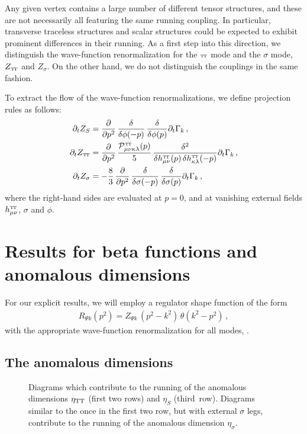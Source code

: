 \documentclass[11pt]{book} %
\newcommand\TTspace{ -1pt }
\newcommand\TT{ \scriptscriptstyle{\mathrm{T\hspace{\TTspace}T}} }
\newcommand\hTTmunu{ h^{\scriptscriptstyle{\mathrm{T\hspace{\TTspace}T}}}_{\mu\nu} }
\numberwithin{equation}{chapter}
\begin{document}
Any given vertex contains a large number of different tensor structures,
and these are not necessarily all featuring the same running coupling.
In particular, transverse traceless structures and scalar structures could be expected to exhibit
prominent differences in their running. As a first step into this direction,
we distinguish the wave-function renormalization for the $\TT$ mode and the $\sigma$ mode,
$Z_{\TT}$ and $Z_{\sigma}$. On the other hand, we do not distinguish the couplings in the same fashion.

To extract the flow of the wave-function renormalizations, we define projection rules as follows:
\begin{align}
  \partial_t Z_S &=
  \frac{\partial}{\partial p^2} \, \frac{\delta}{\delta \phi(-p)} \, \frac{\delta}{\delta \phi(p)} \partial_t \Gamma_k \,, \\
  \partial_t Z_{\TT} &=
  \frac{\partial}{\partial p^2}  \, \frac{\mathcal P^{\TT}_{\mu \nu\kappa\lambda}(p)}{5}  \, \frac{\delta^2}{\delta \hTTmunu (p) \, \delta h^{\TT}_{\kappa \lambda}(-p)} \partial_t \Gamma_k \,, \\
  \partial_t Z_{\sigma} &= -\frac{8}{3} \,
  \frac{\partial}{\partial p^2} \, \frac{\delta}{\delta \sigma(-p)} \, \frac{\delta}{\delta \sigma(p)} \partial_t \Gamma_k \,,
\end{align}
where the right-hand sides are evaluated at $p=0$,
and at vanishing external fields $\hTTmunu$, $\sigma$ and $\phi$.


\section{Results for beta functions and anomalous dimensions}

For our explicit results, we will employ a regulator shape function of the form
\begin{align}
  \nonumber
  R_{\Psi k} \left( p^2\right) = Z_{\Psi k} \, (p^2-k^2) \, \theta(k^2-p^2) \,,
\end{align}
with the appropriate wave-function renormalization for all modes,  \cite{Litim:2001up}.


\subsection{The anomalous dimensions}

\begin{figure}[p]
  \begin{center}
    
  \end{center}
  \caption{
    Diagrams which contribute to the running of the anomalous dimensions
    $\eta_{\rm TT}$ (first two rows) and $\eta_S$ (third~row).
    Diagrams similar to the once in the first two row, but with external $\sigma$ legs,
    contribute to the running of the anomalous dimension $\eta_{\sigma}$.
  }
  \label{fig:eta-diagrams-ch4}
\end{figure}
\end{document}
